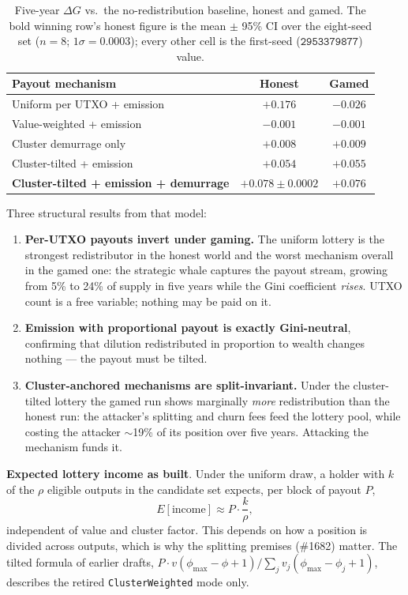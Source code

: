 \begin{table}[h]
\centering
\caption{Five-year $\Delta G$ vs.\ the no-redistribution baseline, honest and
gamed. The bold winning row's honest figure is the mean $\pm$ 95\% CI over the
eight-seed set ($n=8$; $1\sigma = 0.0003$); every other cell is the
first-seed ($\mathtt{2953379877}$) value.}
\label{tab:gini-experiment}
\begin{tabular}{@{}lcc@{}}
\toprule
\textbf{Payout mechanism} & \textbf{Honest} & \textbf{Gamed} \\
\midrule
Uniform per UTXO + emission & $+0.176$ & $\mathbf{-0.026}$ \\
Value-weighted + emission & $-0.001$ & $-0.001$ \\
Cluster demurrage only & $+0.008$ & $+0.009$ \\
Cluster-tilted + emission & $+0.054$ & $+0.055$ \\
\textbf{Cluster-tilted + emission + demurrage} & $\mathbf{+0.078 \pm 0.0002}$ & $+0.076$ \\
\bottomrule
\end{tabular}
\end{table}

Three structural results from that model:

\begin{enumerate}
  \item \textbf{Per-UTXO payouts invert under gaming.} The uniform lottery
    is the strongest redistributor in the honest world and the worst
    mechanism overall in the gamed one: the strategic whale captures the
    payout stream, growing from 5\% to 24\% of supply in five years while
    the Gini coefficient \emph{rises}. UTXO count is a free variable;
    nothing may be paid on it.
  \item \textbf{Emission with proportional payout is exactly Gini-neutral},
    confirming that dilution redistributed in proportion to wealth changes
    nothing --- the payout must be tilted.
  \item \textbf{Cluster-anchored mechanisms are split-invariant.} Under the
    cluster-tilted lottery the gamed run shows marginally \emph{more}
    redistribution than the honest run: the attacker's splitting and churn
    fees feed the lottery pool, while costing the attacker $\sim$19\% of its
    position over five years. Attacking the mechanism funds it.
\end{enumerate}

\textbf{Expected lottery income as built}. Under the uniform draw, a holder
with $k$ of the $\rho$ eligible outputs in the candidate set expects, per
block of payout $P$,
\begin{equation}
E[\text{income}] \approx P \cdot \frac{k}{\rho},
\end{equation}
independent of value and cluster factor. This depends on how a position is
divided across outputs, which is why the splitting premises (\#1682) matter.
The tilted formula of earlier drafts,
$P \cdot v(\phi_{\max}-\phi+1) / \sum_j v_j(\phi_{\max}-\phi_j+1)$, describes
the retired \texttt{ClusterWeighted} mode only.

